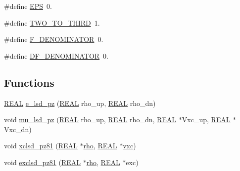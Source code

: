 \begin{DoxyCompactItemize}
\item 
\#define \hyperlink{_t_d_d_f_t_2_o_n-_n_e_g_f-share_2xclsd__pz81_8c_a6ebf6899d6c1c8b7b9d09be872c05aae}{E\-P\-S}~0.
\item 
\#define \hyperlink{_t_d_d_f_t_2_o_n-_n_e_g_f-share_2xclsd__pz81_8c_a2bbe95dffef79309c8740f48c3060c7c}{T\-W\-O\-\_\-\-T\-O\-\_\-\-T\-H\-I\-R\-D}~1.
\item 
\#define \hyperlink{_t_d_d_f_t_2_o_n-_n_e_g_f-share_2xclsd__pz81_8c_a2f4df01adbf5a5b8b05f8afff97db1b4}{F\-\_\-\-D\-E\-N\-O\-M\-I\-N\-A\-T\-O\-R}~0.
\item 
\#define \hyperlink{_t_d_d_f_t_2_o_n-_n_e_g_f-share_2xclsd__pz81_8c_a4cd590430265e7f061c979508fbb49fd}{D\-F\-\_\-\-D\-E\-N\-O\-M\-I\-N\-A\-T\-O\-R}~0.
\end{DoxyCompactItemize}
\subsection*{Functions}
\begin{DoxyCompactItemize}
\item 
\hyperlink{md_8h_a4b654506f18b8bfd61ad2a29a7e38c25}{R\-E\-A\-L} \hyperlink{_t_d_d_f_t_2_o_n-_n_e_g_f-share_2xclsd__pz81_8c_aeaf35e6d0fdd593fc78090b272bfe6a3}{e\-\_\-lsd\-\_\-pz} (\hyperlink{md_8h_a4b654506f18b8bfd61ad2a29a7e38c25}{R\-E\-A\-L} rho\-\_\-up, \hyperlink{md_8h_a4b654506f18b8bfd61ad2a29a7e38c25}{R\-E\-A\-L} rho\-\_\-dn)
\item 
void \hyperlink{_t_d_d_f_t_2_o_n-_n_e_g_f-share_2xclsd__pz81_8c_a60e4f1b2a5f7f5f0339882d7eea059e6}{mu\-\_\-lsd\-\_\-pz} (\hyperlink{md_8h_a4b654506f18b8bfd61ad2a29a7e38c25}{R\-E\-A\-L} rho\-\_\-up, \hyperlink{md_8h_a4b654506f18b8bfd61ad2a29a7e38c25}{R\-E\-A\-L} rho\-\_\-dn, \hyperlink{md_8h_a4b654506f18b8bfd61ad2a29a7e38c25}{R\-E\-A\-L} $\ast$Vxc\-\_\-up, \hyperlink{md_8h_a4b654506f18b8bfd61ad2a29a7e38c25}{R\-E\-A\-L} $\ast$Vxc\-\_\-dn)
\item 
void \hyperlink{_t_d_d_f_t_2_o_n-_n_e_g_f-share_2xclsd__pz81_8c_a89011927ce2e8e4eb0994500c6c3d8f8}{xclsd\-\_\-pz81} (\hyperlink{md_8h_a4b654506f18b8bfd61ad2a29a7e38c25}{R\-E\-A\-L} $\ast$\hyperlink{md_8h_a52b35cee8a5db846ce98f4904e1c8b13}{rho}, \hyperlink{md_8h_a4b654506f18b8bfd61ad2a29a7e38c25}{R\-E\-A\-L} $\ast$\hyperlink{md_8h_a48f792faf570d41e1d58b4a4e1bce251}{vxc})
\item 
void \hyperlink{_t_d_d_f_t_2_o_n-_n_e_g_f-share_2xclsd__pz81_8c_a4d3cd87999f6538bf94851a22f61529d}{exclsd\-\_\-pz81} (\hyperlink{md_8h_a4b654506f18b8bfd61ad2a29a7e38c25}{R\-E\-A\-L} $\ast$\hyperlink{md_8h_a52b35cee8a5db846ce98f4904e1c8b13}{rho}, \hyperlink{md_8h_a4b654506f18b8bfd61ad2a29a7e38c25}{R\-E\-A\-L} $\ast$exc)
\end{DoxyCompactItemize}


